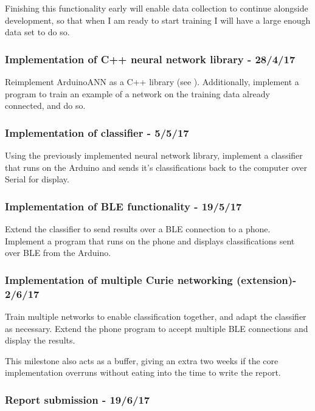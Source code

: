 \documentclass[a4paper]{article}
\begin{document}
Finishing this functionality early will enable data collection to continue alongside development, so that when I am ready to start training I will have a large enough data set to do so.

\subsubsection{Implementation of C++ neural network library - 28/4/17}

Reimplement ArduinoANN as a C++ library (see ). Additionally, implement a program to train an example of a network on the training data already connected, and do so.

\subsubsection{Implementation of classifier - 5/5/17}

Using the previously implemented neural network library, implement a classifier that runs on the Arduino and sends it's classifications back to the computer over Serial for display.

\subsubsection{Implementation of BLE functionality - 19/5/17}

Extend the classifier to send results over a BLE connection to a phone. Implement a program that runs on the phone and displays classifications sent over BLE from the Arduino.

\subsubsection{Implementation of multiple Curie networking (extension)- 2/6/17}

Train multiple networks to enable classification together, and adapt the classifier as necessary.
Extend the phone program to accept multiple BLE connections and display the results.

This milestone also acts as a buffer, giving an extra two weeks if the core implementation overruns without eating into the time to write the report.

\subsubsection{Report submission - 19/6/17}
\end{document}
